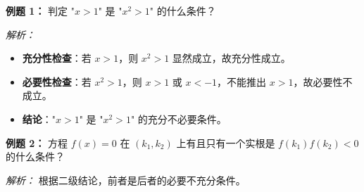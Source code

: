 \begin{examplebox}
\textbf{例题 1：} 判定 "$x > 1$" 是 "$x^2 > 1$" 的什么条件？

\textit{解析：}
\begin{itemize}
    \item \textbf{充分性检查}：若 $x > 1$，则 $x^2 > 1$ 显然成立，故充分性成立。
    \item \textbf{必要性检查}：若 $x^2 > 1$，则 $x > 1$ 或 $x < -1$，不能推出 $x > 1$，故必要性不成立。
    \item \textbf{结论}："$x > 1$" 是 "$x^2 > 1$" 的充分不必要条件。
\end{itemize}

\textbf{例题 2：} 方程 $f(x)=0$ 在 $(k_1, k_2)$ 上有且只有一个实根是 $f(k_1)f(k_2)<0$ 的什么条件？

\textit{解析：} 根据二级结论，前者是后者的必要不充分条件。
\end{examplebox}